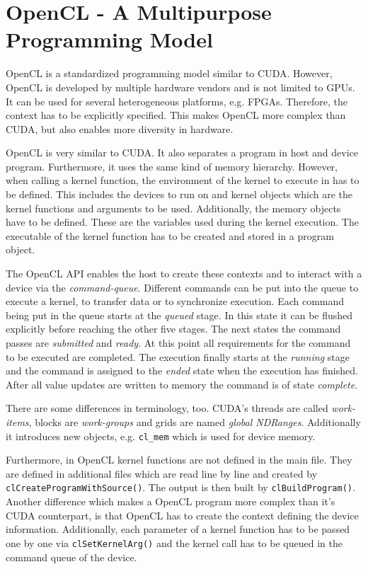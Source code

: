 \section{OpenCL - A Multipurpose Programming Model}
\label{sec:OpenCL}
  OpenCL is a standardized programming model similar to CUDA.
  However, OpenCL is developed by multiple hardware vendors and is not limited to GPUs.
  It can be used for several heterogeneous platforms, e.g. FPGAs.
  Therefore, the context has to be explicitly specified.
  This makes OpenCL more complex than CUDA, but also enables more diversity in hardware.~\cite{Rauber.2012}

  OpenCL is very similar to CUDA.
  It also separates a program in host and device program.
  Furthermore, it uses the same kind of memory hierarchy.
  However, when calling a kernel function, the environment of the kernel to execute in has to be defined.
  This includes the devices to run on and kernel objects which are the kernel functions and arguments to be used.
  Additionally, the memory objects have to be defined.
  These are the variables used during the kernel execution.
  The executable of the kernel function has to be created and stored in a program object.~\cite{Khronos.2019}
  
  
  The OpenCL API enables the host to create these contexts and to interact with a device via the \textit{command-queue}.
  Different commands can be put into the queue to execute a kernel, to transfer data or to synchronize execution.
  Each command being put in the queue starts at the \textit{queued} stage.
  In this state it can be flushed explicitly before reaching the other five stages.
  The next states the command passes are \textit{submitted} and \textit{ready}.
  At this point all requirements for the command to be executed are completed.
  The execution finally starts at the \textit{running} stage and the command is assigned to the \textit{ended} state when the execution has finished.
  After all value updates are written to memory the command is of state \textit{complete}.
    
  There are some differences in terminology, too.
  CUDA's threads are called \textit{work-items}, blocks are \textit{work-groups} and grids are named \textit{global NDRanges}.
  Additionally it introduces new objects, e.g. \texttt{cl\_mem} which is used for device memory.
    
  Furthermore, in OpenCL kernel functions are not defined in the main file.
  They are defined in additional files which are read line by line and created by \texttt{clCreateProgramWithSource()}.
  The output is then built by \texttt{clBuildProgram()}.
  Another difference which makes a OpenCL program more complex than it's CUDA counterpart, is that OpenCL has to create the context defining the device information.
  Additionally, each parameter of a kernel function has to be passed one by one via \texttt{clSetKernelArg()} and the kernel call has to be queued in the command queue of the device.
